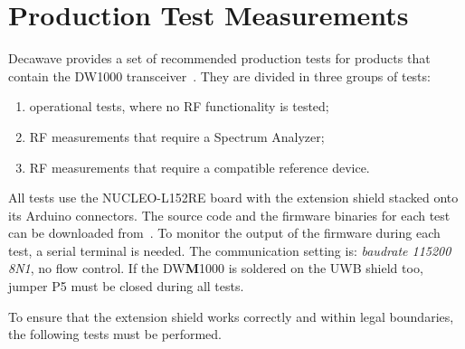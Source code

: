 \documentclass[journal,comsoc]{IEEEtran}
\begin{document}
%




\appendices
\section{Production Test Measurements}
\label{sec:prodtests}
Decawave provides a set of recommended production tests for products that contain the DW1000 transceiver~\cite{prodtest}. They are divided in three groups of tests:
\begin{enumerate}
	\item operational tests, where no RF functionality is tested;
	\item RF measurements that require a Spectrum Analyzer;
	\item RF measurements that require a compatible reference device.
\end{enumerate}
All tests use the NUCLEO-L152RE board with the extension shield stacked onto its Arduino connectors. The source code and the firmware binaries for each test can be downloaded from~\cite{berndrepo:prodtests}. To monitor the output of the firmware during each test, a serial terminal is needed. The communication setting is: \textit{baudrate 115200 8N1}, no flow control.
If the DW\textbf{M}1000 is soldered on the UWB shield too, jumper P5 must be closed during all tests.

To ensure that the extension shield works correctly and within legal boundaries, the following tests must be performed.
\end{document}
